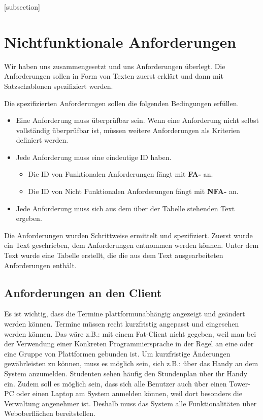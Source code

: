 
\clearpage

[subsection]
\newcommand\printnfreqnr{\stepcounter{nfreq}NFA-\the\value{subsection}\num[minimum-integer-digits=2]{\thenfreq}}

\section{Nichtfunktionale Anforderungen}
Wir haben uns zusammengesetzt und uns Anforderungen überlegt. Die Anforderungen sollen in Form von Texten zuerst erklärt und dann mit Satzschablonen spezifiziert werden. 

\vspace{6pt}

Die spezifizierten Anforderungen sollen die folgenden Bedingungen erfüllen.
\begin{itemize}
	\item Eine Anforderung muss überprüfbar sein. Wenn eine Anforderung nicht selbst vollständig überprüfbar ist, müssen weitere Anforderungen als Kriterien definiert werden.
	\item Jede Anforderung muss eine eindeutige ID haben. 
	\begin{itemize}
		\item Die ID von Funktionalen Anforderungen fängt mit \textbf{FA-} an.
		\item Die ID von Nicht Funktionalen Anforderungen fängt mit \textbf{NFA-} an.
	\end{itemize}
	\item Jede Anforderung muss sich aus dem über der Tabelle stehenden Text ergeben.
\end{itemize}

Die Anforderungen wurden Schrittweise ermittelt und spezifiziert. Zuerst wurde ein Text geschrieben, dem Anforderungen entnommen werden können. Unter dem Text wurde eine Tabelle erstellt, die die aus dem Text ausgearbeiteten Anforderungen enthält.

\newpage

\subsection{Anforderungen an den Client}
Es ist wichtig, dass die Termine plattformunabhängig angezeigt und geändert werden können. Termine müssen recht kurzfristig angepasst und eingesehen werden können. Das wäre z.B.: mit einem Fat-Client nicht gegeben, weil man bei der Verwendung einer Konkreten Programmiersprache in der Regel an eine oder eine Gruppe von Plattformen gebunden ist. Um kurzfristige Änderungen gewährleisten zu können, muss es möglich sein, sich z.B.: über das Handy an dem System anzumelden. Studenten sehen häufig den Stundenplan über ihr Handy ein. Zudem soll es möglich sein, dass sich alle Benutzer auch über einen Tower-PC oder einen Laptop am System anmelden können, weil dort besonders die Verwaltung angenehmer ist. Deshalb muss das System alle Funktionalitäten über Weboberflächen bereitstellen.

